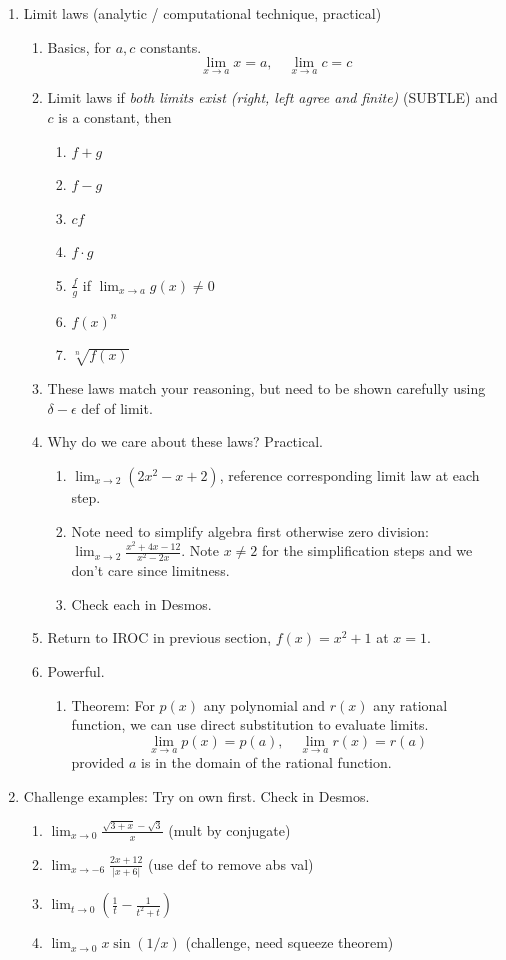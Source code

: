 \documentclass{article}
\newcommand{\ds}{\displaystyle}
\begin{document}
\begin{enumerate}
\item Limit laws (analytic / computational technique, practical)
\begin{enumerate}
\item Basics, for $a,c$ constants.
$$
\lim_{x\rightarrow a} x = a,\quad \lim_{x\rightarrow a} c = c
$$
\item Limit laws if \emph{both limits exist (right, left agree and finite)} (SUBTLE) and $c$ is a constant, then 
\begin{enumerate}
\item $f+g$
\item $f-g$
\item $cf$
\item  $f\cdot g$
\item $\frac{f}{g}$ if $\lim_{x\rightarrow a} g(x) \neq 0$
\item $f(x)^n$
\item $\sqrt[n]{f(x)}$
\end{enumerate}
\item These laws match your reasoning, but need to be shown carefully using $\delta- \epsilon$ def of limit.
\item Why do we care about these laws? Practical. 
\begin{enumerate}
\item $ \ds \lim_{x\rightarrow 2} \left( 2x^2 - x + 2\right) $, reference corresponding limit law at each step.
\item Note need to simplify algebra first otherwise zero division: $\ds \lim_{x \rightarrow 2} \frac{x^2 + 4x - 12}{x^2-2x}$. Note $x \neq 2$ for the simplification steps and we don't care since limitness.
\item Check each in Desmos.
\end{enumerate}
\item Return to IROC in previous section, $f(x)=x^2+1$ at $x=1$. 
\item Powerful. 
\begin{enumerate}
\item Theorem: For $p(x)$ any polynomial and $r(x)$ any rational function, we can use direct substitution to evaluate limits.
\[
\lim_{x\rightarrow a} p(x) = p(a), \quad \lim_{x\rightarrow a} r(x) = r(a)
\]
provided $a$ is in the domain of the rational function. 
\end{enumerate}
\end{enumerate}

\item Challenge examples: Try on own first. Check in Desmos.
\begin{enumerate}
\item $\lim_{x \rightarrow 0} \frac{\sqrt{3+x}-\sqrt{3}}{x}$ (mult by conjugate)
\item $\lim_{x \rightarrow -6} \frac{2x+12}{|x+6|} $ (use def to remove abs val)
\item $\lim_{t \rightarrow 0} \left(\frac{1}{t} - \frac{1}{t^2+t} \right)$
\item $\lim_{x \rightarrow 0} x \sin(1/x)$ (challenge, need squeeze theorem)
\end{enumerate}


\end{enumerate}
\end{document}
